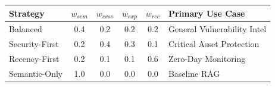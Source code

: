 \begin{tabular}{@{}lccccp{2.5cm}@{}}
\toprule
\textbf{Strategy} & $w_{sem}$ & $w_{cvss}$ & $w_{exp}$ & $w_{rec}$ & \textbf{Primary Use Case} \\ \midrule
Balanced & 0.4 & 0.2 & 0.2 & 0.2 & General Vulnerability Intel \\
Security-First & 0.2 & 0.4 & 0.3 & 0.1 & Critical Asset Protection \\
Recency-First & 0.2 & 0.1 & 0.1 & 0.6 & Zero-Day Monitoring \\
Semantic-Only & 1.0 & 0.0 & 0.0 & 0.0 & Baseline RAG \\ \bottomrule
\end{tabular}
